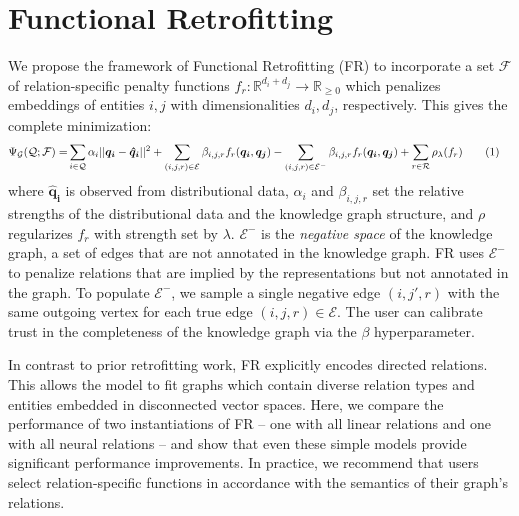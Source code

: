 \documentclass[11pt, a4paper]{article}
\newcommand\numberthis{\addtocounter{equation}{1}\tag{\theequation}}
\begin{document}
\section{Functional Retrofitting}
We propose the framework of Functional Retrofitting (FR) to incorporate a set $\mathcal{F}$ of relation-specific penalty functions $f_r:\mathbb{R}^{d_i+d_j}\rightarrow \mathbb{R}_{\ge 0}$ which penalizes embeddings of entities $i,j$ with dimensionalities $d_i,d_j$, respectively. 
This gives the complete minimization:
\begin{align*}
\Psi_{\mathcal{G}}(\mathcal{Q}; \mathcal{F}) = &\sum_{i\in\mathcal{Q}}\alpha_i||\boldsymbol{q_i} - \boldsymbol{\hat{q}_i}||^2 + \sum_{(i,j,r)\in \mathcal{E}}\beta_{i,j,r}f_{r}(\boldsymbol{q_i}, \boldsymbol{q_j}) - \sum_{(i,j,r)\in \mathcal{E}^-}\beta_{i,j,r}f_{r}(\boldsymbol{q_i}, \boldsymbol{q_j}) + \sum_{r\in \mathcal{R}}\rho_{\lambda}(f_r)\numberthis{}
\end{align*}
where $\boldsymbol{\hat{q}_i}$ is observed from distributional data, $\alpha_i$ and $\beta_{i,j,r}$ set the relative strengths of the distributional data and the knowledge graph structure, and $\rho$
regularizes $f_r$ with strength set by $\lambda$. $\mathcal{E}^-$ is the \emph{negative space} of the knowledge graph, a set of edges that are not annotated in the knowledge graph. FR uses $\mathcal{E}^-$ to penalize relations that are implied by the representations but not annotated in the graph. To populate $\mathcal{E}^-$, we sample a single negative edge $(i,j',r)$ with the same outgoing vertex for each true edge $(i,j,r)\in\mathcal{E}$. The user can calibrate trust in the completeness of the knowledge graph via the $\beta$ hyperparameter.

In contrast to prior retrofitting work, FR explicitly encodes directed relations. This allows the model to fit graphs which contain diverse relation types and entities embedded in disconnected vector spaces. Here, we compare the performance of two instantiations of FR -- one with all linear relations and one with all neural relations -- and show that even these simple models provide significant performance improvements. In practice, we recommend that users select relation-specific functions in accordance with the semantics of their graph's relations.

\end{document}
